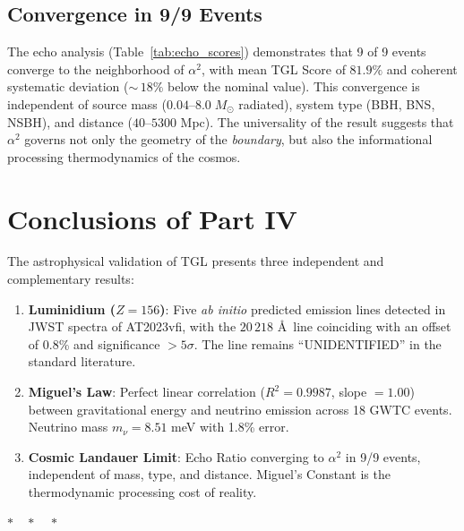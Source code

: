 \documentclass[12pt,a4paper,twoside]{article}
\newcommand{\alphaii}{\alpha^{2}}
\newcommand{\boundary}{\textit{boundary}}
\begin{document}
\subsection{Convergence in 9/9 Events}

The echo analysis (Table~\ref{tab:echo_scores}) demonstrates that 9 of 9 events converge to the neighborhood of $\alphaii$, with mean TGL Score of $81.9\%$ and coherent systematic deviation (${\sim}\,18\%$ below the nominal value). This convergence is independent of source mass ($0.04$--$8.0\;M_\odot$ radiated), system type (BBH, BNS, NSBH), and distance ($40$--$5300$ Mpc). The universality of the result suggests that $\alphaii$ governs not only the geometry of the \boundary, but also the informational processing thermodynamics of the cosmos.


\section{Conclusions of Part IV}


The astrophysical validation of TGL presents three independent and complementary results:

\begin{enumerate}[nosep]
\item \textbf{Luminidium ($Z = 156$)}: Five \textit{ab initio} predicted emission lines detected in JWST spectra of AT2023vfi, with the $20\,218$ \AA\ line coinciding with an offset of 0.8\% and significance $> 5\sigma$. The line remains ``UNIDENTIFIED'' in the standard literature.

\item \textbf{Miguel's Law}: Perfect linear correlation ($R^2 = 0.9987$, slope $= 1.00$) between gravitational energy and neutrino emission across 18 GWTC events. Neutrino mass $m_\nu = 8.51$ meV with 1.8\% error.

\item \textbf{Cosmic Landauer Limit}: Echo Ratio converging to $\alphaii$ in 9/9 events, independent of mass, type, and distance. Miguel's Constant is the thermodynamic processing cost of reality.
\end{enumerate}

\bigskip

\begin{center}
$\ast\quad\ast\quad\ast$
\end{center}
\bigskip
\end{document}
